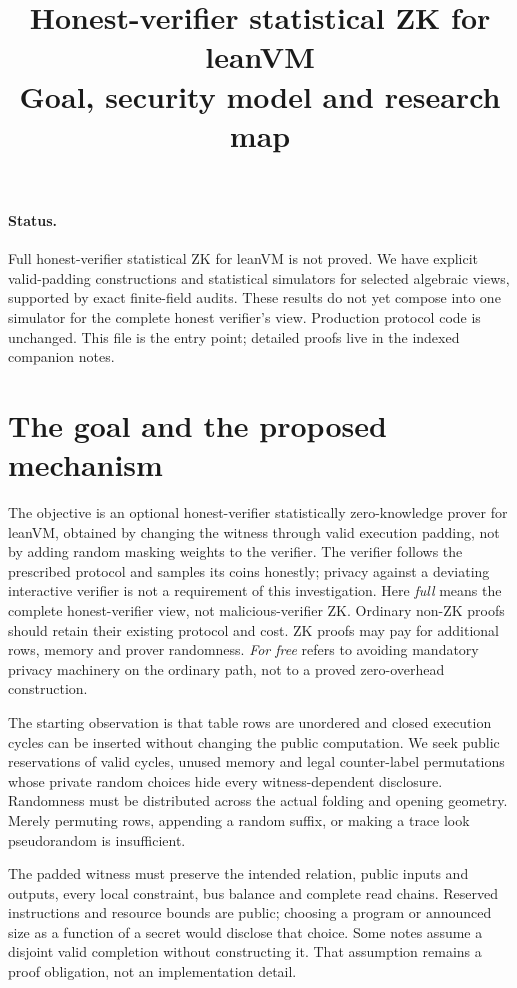 \documentclass[11pt]{article}
\title{Honest-verifier statistical ZK for leanVM\\Goal, security model and research map}
\author{}
\date{}
\theoremstyle{definition}
\begin{document}
\maketitle
\vspace{-2em}

\paragraph{Status.} Full honest-verifier statistical ZK for leanVM is not proved. We have explicit valid-padding constructions and statistical simulators for selected algebraic views, supported by exact finite-field audits. These results do not yet compose into one simulator for the complete honest verifier's view. Production protocol code is unchanged. This file is the entry point; detailed proofs live in the indexed companion notes.

\section{The goal and the proposed mechanism}\label{sec:zk-goal}

The objective is an optional honest-verifier statistically zero-knowledge prover for leanVM, obtained by changing the witness through valid execution padding, not by adding random masking weights to the verifier. The verifier follows the prescribed protocol and samples its coins honestly; privacy against a deviating interactive verifier is not a requirement of this investigation. Here \emph{full} means the complete honest-verifier view, not malicious-verifier ZK. Ordinary non-ZK proofs should retain their existing protocol and cost. ZK proofs may pay for additional rows, memory and prover randomness. \emph{For free} refers to avoiding mandatory privacy machinery on the ordinary path, not to a proved zero-overhead construction.

The starting observation is that table rows are unordered and closed execution cycles can be inserted without changing the public computation. We seek public reservations of valid cycles, unused memory and legal counter-label permutations whose private random choices hide every witness-dependent disclosure. Randomness must be distributed across the actual folding and opening geometry. Merely permuting rows, appending a random suffix, or making a trace look pseudorandom is insufficient.

The padded witness must preserve the intended relation, public inputs and outputs, every local constraint, bus balance and complete read chains. Reserved instructions and resource bounds are public; choosing a program or announced size as a function of a secret would disclose that choice. Some notes assume a disjoint valid completion without constructing it. That assumption remains a proof obligation, not an implementation detail.
\end{document}
